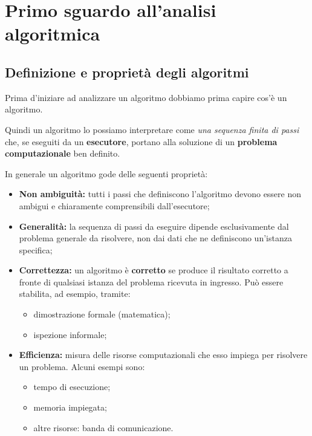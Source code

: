 \chapter{Primo sguardo all'analisi algoritmica}

\section{Definizione e proprietà degli algoritmi}

Prima d'iniziare ad analizzare un algoritmo dobbiamo prima capire cos'è un algoritmo.


Quindi un algoritmo lo possiamo interpretare come \textit{una sequenza finita di passi} che,
se eseguiti da un \textbf{esecutore}, portano alla soluzione di un \textbf{problema computazionale} ben definito.

In generale un algoritmo gode delle seguenti proprietà:
\begin{itemize}
   \item \textbf{Non ambiguità:} tutti i passi che definiscono l'algoritmo devono essere non ambigui e chiaramente comprensibili dall'esecutore;
	\item \textbf{Generalità:} la sequenza di passi da eseguire dipende esclusivamente dal problema generale da risolvere, non dai dati che ne definiscono un'istanza specifica;
	\item \textbf{Correttezza:} un algoritmo è \textbf{corretto} se produce il risultato corretto a fronte di qualsiasi istanza del problema ricevuta in ingresso. Può essere stabilita, ad esempio, tramite:
	\begin{itemize}
		\item dimostrazione formale (matematica);
		\item ispezione informale;
	\end{itemize}
	\item \textbf{Efficienza:} misura delle risorse computazionali che esso impiega per risolvere un problema. Alcuni esempi sono:
	\begin{itemize}
		\item tempo di esecuzione;
		\item memoria impiegata;
		\item altre risorse: banda di comunicazione.
	\end{itemize}
\end{itemize}

